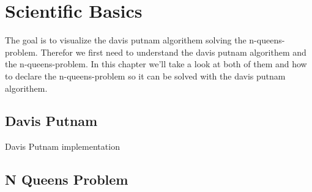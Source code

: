 

\chapter{Scientific Basics}

The goal is to visualize the davis putnam algorithem solving the n-queens-problem.
Therefor we first need to understand the davis putnam algorithem and the n-queens-problem.
In this chapter we'll take a look at both of them and how to declare the n-queens-problem so it can be solved with the davis putnam algorithem.

\section{Davis Putnam}
Davis Putnam implementation \cite{DavisPutnamImp}

\section{N Queens Problem}
